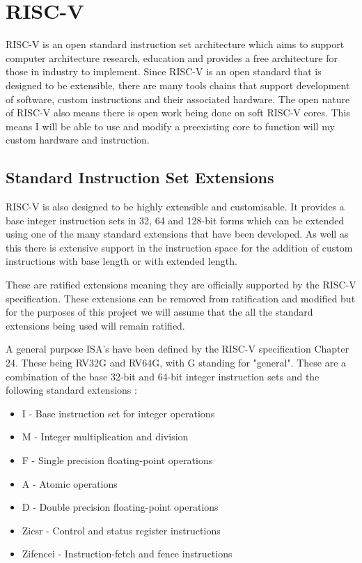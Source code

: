 \section{RISC-V}

RISC-V\cite{RVISAManualVol1} is an open standard instruction set architecture which aims to support computer architecture research, education and provides a free architecture for those in industry to implement.
Since RISC-V is an open standard that is designed to be extensible, there are many tools chains that support development of software, custom instructions and their associated hardware.
The open nature of RISC-V also means there is open work being done on soft RISC-V cores. This means I will be able to use and modify a preexisting core to function will my custom hardware and instruction.

\subsection{Standard Instruction Set Extensions}


RISC-V is also designed to be highly extensible and customisable. It provides a base integer instruction sets in 32, 64 and 128-bit forms which can be extended using one of the many standard extensions that have been developed. As well as this there is extensive support in the instruction space for the addition of custom instructions with base length or with extended length.

These are ratified extensions meaning they are officially supported by the RISC-V specification. These extensions can be removed from ratification and modified but for the purposes of this project we will assume that the all the standard extensions being used will remain ratified.

A general purpose ISA's have been defined by the RISC-V specification Chapter 24. These being RV32G and RV64G, with G standing for "general". These are a combination of the base 32-bit and 64-bit integer instruction sets and the following standard extensions \cite{RVISAManualVol1}:
\begin{itemize}
    \item I - Base instruction set for integer operations
    \item M - Integer multiplication and division
    \item F - Single precision floating-point operations
    \item A - Atomic operations
    \item D - Double precision floating-point operations
    \item Zicsr - Control and status register instructions
    \item Zifencei - Instruction-fetch and fence instructions
\end{itemize}


